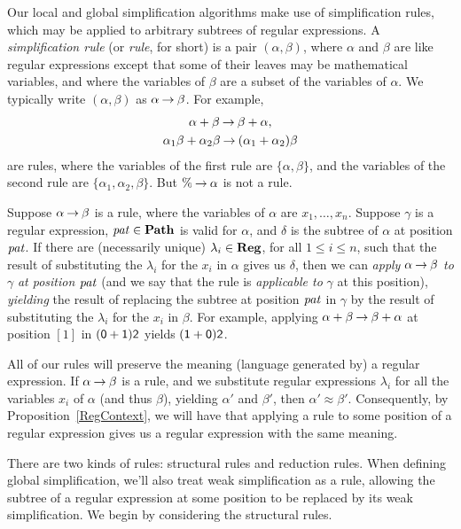 Our local and global simplification algorithms make use of
simplification rules, which may be applied to arbitrary subtrees of
%
%
regular expressions. A \emph{simplification rule} (or \emph{rule}, for
short) is a pair $(\alpha, \beta)$, where $\alpha$ and $\beta$ are
like regular expressions except that some of their leaves may be
mathematical variables, and where the variables of $\beta$ are a
subset of the variables of $\alpha$. We typically write $(\alpha, \beta)$
as $\alpha\mathbin{\to}\beta$. For example,
\begin{gather*}
\alpha + \beta\mathbin{\to} \beta+\alpha , \\
\alpha_1\beta + \alpha_2\beta \mathbin{\to} (\alpha_1+\alpha_2)\beta
\end{gather*}
are rules, where the variables of the first rule are $\{\alpha,\beta\}$,
and the variables of the second rule are $\{\alpha_1, \alpha_2, \beta\}$.
But $\%\mathbin{\to}\alpha$ is not a rule.

Suppose $\alpha\mathbin{\to}\beta$ is a rule, where the variables of $\alpha$
are $x_1,\ldots,x_n$.  Suppose $\gamma$ is a regular expression,
${\it pat}\in\mathbf{Path}$ is valid for $\alpha$, and $\delta$ is the subtree of
$\alpha$ at position ${\it pat}$.  If there are (necessarily unique)
$\lambda_i\in\mathbf{Reg}$, for all $1\leq i\leq n$, such that the result of
substituting the $\lambda_i$ for the $x_i$ in $\alpha$ gives us
$\delta$, then we can \emph{apply} $\alpha\mathbin{\to}\beta$ \emph{to}
%
%
$\gamma$ \emph{at position} ${\it pat}$ (and we say that the rule is
\emph{applicable to} $\gamma$ at this position), \emph{yielding} the
result of replacing the subtree at position ${\it pat}$ in $\gamma$ by the
result of substituting the $\lambda_i$ for the $x_i$ in $\beta$.  For
example, applying $\alpha+\beta\mathbin{\to}\beta+\alpha$ at position $[1]$ in
$(\mathsf{0} + \mathsf{1})\mathsf{2}$ yields $(\mathsf{1} + \mathsf{0})\mathsf{2}$.

All of our rules will preserve the meaning (language generated by) a
regular expression. If $\alpha\mathbin{\to}\beta$ is a rule, and we substitute
regular expressions $\lambda_i$ for all the variables $x_i$ of
$\alpha$ (and thus $\beta$), yielding $\alpha'$ and $\beta'$, then
$\alpha'\approx\beta'$. Consequently, by Proposition~\ref{RegContext},
we will have that applying a rule to some position of a regular
expression gives us a regular expression with the same meaning.

There are two kinds of rules: structural rules and reduction rules.
When defining global simplification, we'll also treat weak
simplification as a rule, allowing the subtree of a regular expression
at some position to be replaced by its weak simplification.  We begin
by considering the structural rules.

